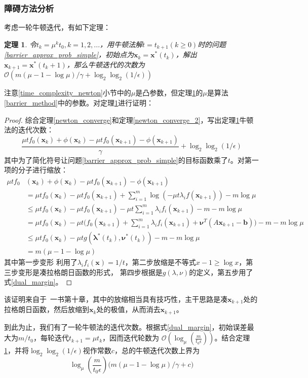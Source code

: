 \documentclass{article}
\newtheorem{thm}{定理}
\begin{document}
\subsubsection{障碍方法分析}
考虑一轮牛顿迭代，有如下定理：
\begin{thm}
    \label{newton_barrier_ana}
    令$t_k=\mu^kt_0,k=1,2,...$，用牛顿法解$t=t_{k+1}(k\ge 0)$时的问题\ref{barrier_approx_prob_simple}，初始点为$\bm x_k=\bm x^*(t_{k})$，解出$\bm x_{k+1}=\bm x^*(t_k+1)$，那么牛顿迭代的次数为
    $\mathcal O(m(\mu-1-\log\mu)/\gamma+\log_2\log_2(1/\epsilon))$
\end{thm}
注意\ref{time_complexity_newton}小节中的$\mu$是凸参数，但定理\ref{newton_barrier_ana}的$\mu$是算法\ref{barrier_method}中的参数。对定理\ref{newton_barrier_ana}进行证明：
\begin{proof}
    综合定理\ref{newton_converge}和定理\ref{newton_converge_2}，写出定理\ref{newton_barrier_ana}牛顿法的迭代次数：
    $$\frac{\mu tf_0(\bm x_{k})+\phi(\bm x_k)-\mu tf_0(\bm x_{k+1})-\phi(\bm x_{k+1})}{\gamma}+\log_2\log_2(1/\epsilon)$$
    其中为了简化符号让问题\ref{barrier_approx_prob_simple}的目标函数乘了$t$。对第一项的分子进行缩放：
\begin{align*}
\mu tf_0&(\bm x_{k})+\phi(\bm x_k)-\mu tf_0(\bm x_{k+1})-\phi(\bm x_{k+1}) \\
&=\mu tf_0(\bm x_{k})-\mu tf_0(\bm x_{k+1})+\sum\limits_{i=1}^m{\log(-\mu t\lambda_if(\bm x_{k+1}))-m\log \mu} \\
&\le \mu tf_0(\bm x_k)-\mu tf_0(\bm x_{k+1})-\mu t\sum\limits_{i=1}^m{\lambda_i f_i(\bm x_{k+1})}-m-m\log \mu \\
&=\mu tf_0(\bm x_k)-\mu t\Big(f_0(\bm x_{k+1})+\sum\limits_{i=1}^m{\lambda_if_i(\bm x_{k+1})}+\bm \nu^T(A\bm x_{k+1}-\bm b)\Big)-m-m\log\mu\\
&\le \mu tf_0(\bm x_k)-\mu tg(\bm \lambda^*(t_k),\bm \nu^*(t_k))-m-m\log\mu\\
&=m(\mu-1-\log\mu)
\end{align*}
其中第一步变形
利用了$\lambda_if_i(\bm x)=1/t$，第二步放缩是不等式$x-1\ge \log x$，第三步变形是凑拉格朗日函数的形式，
第四步根据是$g(\lambda,\nu)$的定义，第五步用了式\eqref{dual_margin}。
\end{proof}
该证明来自于~\cite{10.5555/993483}一书第十章，其中的放缩相当具有技巧性，主干思路是凑$\bm x_{k+1}$处的拉格朗日函数，然后放缩到$\bm x_k$处的极值，从而消去$\bm x_{k+1}$。

到此为止，我们有了一轮牛顿法的迭代次数。根据式\eqref{dual_margin}，初始误差最大为$m/t_0$，每轮迭代$t_{k+1}=\mu t_k$，因而迭代轮数为
$\mathcal O(\log_\mu(\frac{m}{t_0\epsilon}))$。结合定理\ref{newton_barrier_ana}，并将$\log_2\log_2(1/\epsilon)$视作常数$c$，总的牛顿迭代次数上界为
$$\log_\mu(\frac{m}{t_0\epsilon})\Big(m(\mu-1-\log\mu)/\gamma+c\Big)$$
\end{document}
